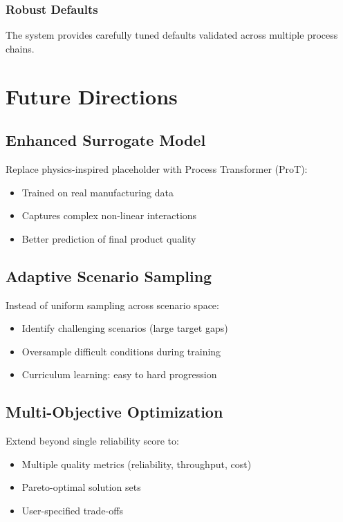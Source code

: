 \documentclass[11pt,a4paper]{article}
\begin{document}
\subsubsection{Robust Defaults}

The system provides carefully tuned defaults validated across multiple process chains.

\section{Future Directions}

\subsection{Enhanced Surrogate Model}

Replace physics-inspired placeholder with Process Transformer (ProT):
\begin{itemize}
    \item Trained on real manufacturing data
    \item Captures complex non-linear interactions
    \item Better prediction of final product quality
\end{itemize}

\subsection{Adaptive Scenario Sampling}

Instead of uniform sampling across scenario space:
\begin{itemize}
    \item Identify challenging scenarios (large target gaps)
    \item Oversample difficult conditions during training
    \item Curriculum learning: easy to hard progression
\end{itemize}

\subsection{Multi-Objective Optimization}

Extend beyond single reliability score to:
\begin{itemize}
    \item Multiple quality metrics (reliability, throughput, cost)
    \item Pareto-optimal solution sets
    \item User-specified trade-offs
\end{itemize}
\end{document}
